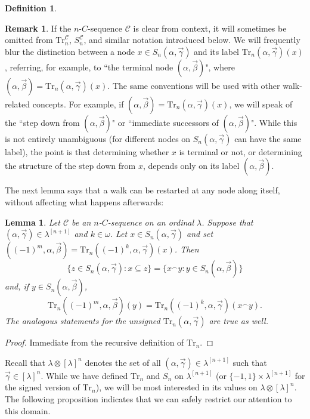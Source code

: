 \documentclass{amsart}
\numberwithin{theorem}{section}
\newtheorem{lemma}[theorem]{Lemma}
\theoremstyle{definition}
\newtheorem{definition}[theorem]{Definition}
\newtheorem{remark}[theorem]{Remark}
\renewcommand{\subset}{\subseteq}
\newcommand{\w}{\omega}
\newcommand{\C}{\mathcal{C}}
\newcommand{\Tr}{\mathrm{Tr}}
\begin{document}
\begin{definition}
\begin{remark}
If the $n$-$C$-sequence $\C$ is clear from context, it will sometimes be omitted 
from $\Tr_n^{\C}$, $S_n^{\C}$, and similar notation introduced below.
We will frequently blur the distinction between a node $x\in S_n(\alpha,\vec\gamma)$ and its label $\Tr_n(\alpha,\vec\gamma)(x)$, referring, for example, to ``the terminal node $(\alpha,\vec\beta)$", where $(\alpha,\vec\beta)=\Tr_n(\alpha,\vec\gamma)(x)$. The same conventions will be used with other walk-related concepts. For example, if $(\alpha,\vec\beta)=\Tr_n(\alpha,\vec\gamma)(x)$, we will speak of the ``step down from $(\alpha,\vec\beta)$" or ``immediate successors of $(\alpha,\vec\beta)$". While this is not entirely unambiguous (for different nodes on $S_n(\alpha,\vec\gamma)$ can have the same label), the point is that determining whether $x$ is terminal or not, or determining the structure of the step down from $x$, depends only on its label $(\alpha,\vec\beta)$. 
\end{remark}

\end{definition}
The next lemma says that a walk can be restarted at any node along itself, without affecting what happens afterwards:
\begin{lemma} \label{lemma: restart}
Let $\C$ be an $n$-$C$-sequence on an ordinal $\lambda$. Suppose that 
$(\alpha,\vec{\gamma}) \in \lambda^{[n+1]}$ and $k\in\w$. Let $x\in S_n(\alpha,\vec\gamma)$ and set $((-1)^m,\alpha,\vec\beta)=\Tr_n((-1)^k,\alpha,\vec\gamma)(x)$. Then
\[
\{z\in S_n(\alpha,\vec\gamma): x\subset z\}=\{x^\smallfrown y:y\in S_n(\alpha,\vec\beta)\}
\]
and, if $y\in S_n(\alpha,\vec\beta)$,
\[
\Tr_n((-1)^m,\alpha,\vec\beta)(y)=\Tr_n((-1)^k,\alpha,\vec\gamma)(x^\smallfrown y).
\]
The analogous statements for the unsigned $\Tr_n(\alpha,\vec\gamma)$ are true as well.
\end{lemma}
\begin{proof}
Immediate from the recursive definition of $\Tr_n$.
\end{proof}

Recall that $\lambda \otimes [\lambda]^n$ denotes the set of all 
$(\alpha,\vec{\gamma}) \in \lambda^{[n+1]}$ such that $\vec{\gamma} \in [\lambda]^n$.
While we have defined $\Tr_n$ and $S_n$ on $\lambda^{[n+1]}$ (or $\{-1,1\} \times 
\lambda^{[n+1]}$ for the signed version of $\Tr_n$), we will be most interested in its values 
on $\lambda \otimes [\lambda]^n$. The following proposition indicates that we can safely 
restrict our attention to this domain.
\end{document}
